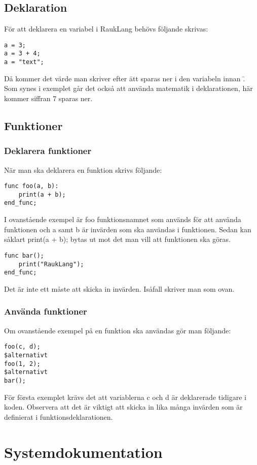 \documentclass[12pt]{TDP019}
\begin{document}
\subsection{Deklaration}
För att deklarera en variabel i RaukLang behövs följande skrivas:
\begin{verbatim}
a = 3;
a = 3 + 4;
a = "text";
\end{verbatim}
Då kommer det värde man skriver efter \= att sparas ner i den variabeln innan \=. Som synes i exemplet går det också att använda matematik i deklarationen, här kommer siffran 7 sparas ner.

\subsection{Funktioner}
\subsubsection{Deklarera funktioner}
När man ska deklarera en funktion skrivs följande:
\begin{verbatim}
func foo(a, b):
    print(a + b);
end_func;
\end{verbatim}
I ovanstående exempel är foo funktionsnamnet som används för att använda funktionen och a samt b är invärden som ska användas i funktionen. Sedan kan såklart print(a + b); bytas ut mot det man vill att funktionen ska göras.

\begin{verbatim}
func bar();
    print("RaukLang");
end_func;
\end{verbatim}
Det är inte ett måste att skicka in invärden. Isåfall skriver man som ovan.
\subsubsection{Använda funktioner}
Om ovanstående exempel på en funktion ska användas gör man följande:
\begin{verbatim}
foo(c, d);
$alternativt
foo(1, 2);
$alternativt
bar();
\end{verbatim}
För första exemplet krävs det att variablerna c och d är deklarerade tidigare i koden. Observera att det är viktigt att skicka in lika många invärden som är definierat i funktionsdeklarationen.

\newpage
\section{Systemdokumentation}
\end{document}
